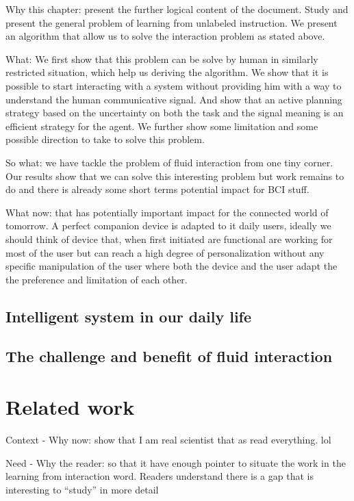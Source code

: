 Why this chapter: present the further logical content of the document. Study and present the general problem of learning from unlabeled instruction. We present an algorithm that allow us to solve the interaction problem as stated above.

What: We first show that this problem can be solve by human in similarly restricted situation, which help us deriving the algorithm. We show that it is possible to start interacting with a system without providing him with a way to understand the human communicative signal. And show that an active planning strategy based on the uncertainty on both the task and the signal meaning is an efficient strategy for the agent. We further show some limitation and some possible direction to take to solve this problem.

So what: we have tackle the problem of fluid interaction from one tiny corner. Our results show that we can solve this interesting problem but work remains to do and there is already some short terms potential impact for BCI stuff. 

What now: that has potentially important impact for the connected world of tomorrow. A perfect companion device is adapted to it daily users, ideally we should think of device that, when first initiated are functional are working for most of the user but can reach a high degree of personalization without any specific manipulation of the user where both the device and the user adapt the the preference and limitation of each other. 

\section{Intelligent system in our daily life}

\section{The challenge and benefit of fluid interaction}

\chapter{Related work}
\minitoc

Context - Why now: show that I am real scientist that as read everything. lol

Need - Why the reader: so that it have enough pointer to situate the work in the learning from interaction word. Readers understand there is a gap that is interesting to ``study'' in more detail

